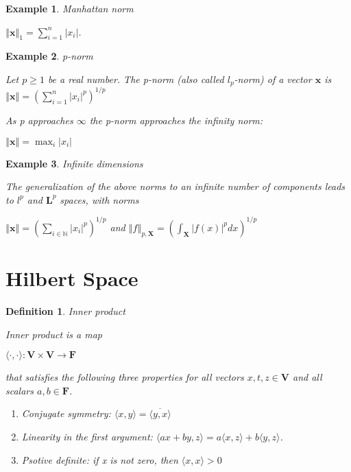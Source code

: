 \documentclass[11pt]{article}
\newtheorem{definition}{Definition}
\newtheorem{example}{Example}
\begin{document}
\begin{example}{Manhattan norm}

$\left\Vert \textbf{x} \right\Vert_1 = \sum_{i=1}^n \left\vert x_i\right\vert$.
\end{example}

\begin{example}{p-norm}

Let $p\geq 1$ be a real number. The p-norm (also called $l_p$-norm) of a vector $\textbf{x}$ is 
$\left\Vert \textbf{x} \right\Vert = (\sum_{i=1}^n |x_i|^p)^{1/p}$

As p approaches $\infty$ the p-norm approaches the infinity norm:

$\left\Vert \textbf{x} \right\Vert = \max_{i}|x_i|$
\end{example}

\begin{example}{Infinite dimensions}

The generalization of the above norms to an infinite number of components leads to $l^p$ and $\textbf{L}^p$ spaces, with norms

$\left\Vert \textbf{x} \right\Vert = (\sum_{i \in \mathbb{N}} |x_i|^p)^{1/p}$ and $\left\Vert f\right\Vert_{p, \textbf{X}} = (\int_{\textbf{X}}|f(x)|^p dx)^{1/p}$
\end{example}

\section{Hilbert Space}

\begin{definition}{Inner product}

Inner product is a map

$\langle\cdot,\cdot\rangle: \textbf{V} \times \textbf{V} \to \textbf{F}$

that satisfies the following three properties for all vectors $x, t, z \in \textbf{V}$ and all scalars $a, b \in \textbf{F}$.
\begin{enumerate}
\item Conjugate symmetry: $\langle x,y\rangle=\overline{\langle y,x\rangle}$
\item Linearity in the first argument: $\langle ax+by,z\rangle=a\langle x,z\rangle+b\langle y,z\rangle$.
\item Psotive definite: if x is not zero, then $\langle x,x\rangle > 0$ 
\end{enumerate}

\end{definition}
\end{document}
